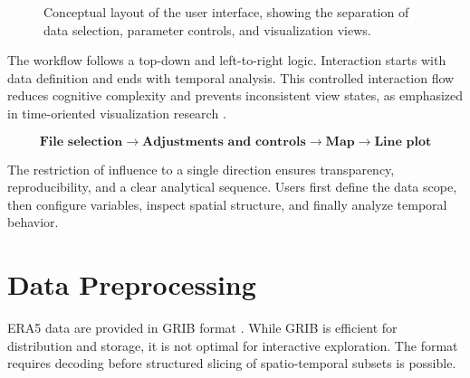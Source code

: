 \newpage

\begin{figure}[htbp]
\centering
{}
\caption{Conceptual layout of the user interface, showing the separation of data selection, parameter controls, and visualization views.}

\end{figure}

The workflow follows a top-down and left-to-right logic. Interaction starts with data definition and ends with temporal analysis. This controlled interaction flow reduces cognitive complexity and prevents inconsistent view states, as emphasized in time-oriented visualization research \parencite{aigner_time_oriented_data}.

\[
\textbf{File selection} \rightarrow 
\textbf{Adjustments and controls} \rightarrow 
\textbf{Map} \rightarrow 
\textbf{Line plot}
\]

The restriction of influence to a single direction ensures transparency, reproducibility, and a clear analytical sequence.
Users first define the data scope, then configure variables, inspect spatial structure, and finally analyze temporal behavior.


\newpage

\section{Data Preprocessing}

ERA5 data are provided in GRIB format \parencite{ecmwf_grib_explanation}. While GRIB is efficient for distribution and storage, it is not optimal for interactive exploration. The format requires decoding before structured slicing of spatio-temporal subsets is possible.

